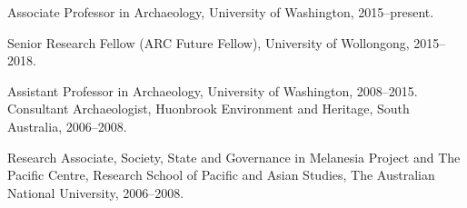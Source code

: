 
\ind Associate Professor in Archaeology,  University of Washington, 2015--present.

\ind Senior Research Fellow (ARC Future Fellow),  University of Wollongong, 2015--2018.     

\ind Assistant Professor in Archaeology,  University of Washington, 2008--2015.     
\ind Consultant Archaeologist, Huonbrook Environment and Heritage, South Australia, 2006--2008.

\ind Research Associate, Society, State and Governance in Melanesia Project and The Pacific Centre, Research School of Pacific and Asian Studies, The Australian National University, 2006--2008.
